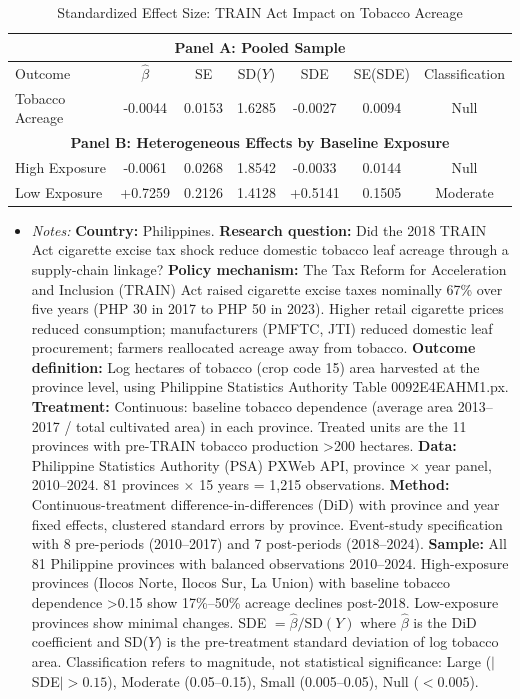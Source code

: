 \begin{table}[h]
\small
\centering
\begin{tabular}{lcccccc}
\hline\hline
\multicolumn{7}{c}{\textbf{Panel A: Pooled Sample}} \\
\hline
Outcome & $\hat{\beta}$ & SE & SD($Y$) & SDE & SE(SDE) & Classification \\
\hline
Tobacco Acreage & -0.0044 & 0.0153 & 1.6285 & -0.0027 & 0.0094 & Null \\
\hline
\multicolumn{7}{c}{\textbf{Panel B: Heterogeneous Effects by Baseline Exposure}} \\
\hline
High Exposure & -0.0061 & 0.0268 & 1.8542 & -0.0033 & 0.0144 & Null \\
Low Exposure & +0.7259 & 0.2126 & 1.4128 & +0.5141 & 0.1505 & Moderate \\
\hline
\end{tabular}
\caption{Standardized Effect Size: TRAIN Act Impact on Tobacco Acreage}
\label{tab:sde}
\begin{itemize}
\item \textit{Notes:} \textbf{Country:} Philippines. \textbf{Research question:} Did the 2018 TRAIN Act cigarette excise tax shock reduce domestic tobacco leaf acreage through a supply-chain linkage? \textbf{Policy mechanism:} The Tax Reform for Acceleration and Inclusion (TRAIN) Act raised cigarette excise taxes nominally 67\% over five years (PHP 30 in 2017 to PHP 50 in 2023). Higher retail cigarette prices reduced consumption; manufacturers (PMFTC, JTI) reduced domestic leaf procurement; farmers reallocated acreage away from tobacco. \textbf{Outcome definition:} Log hectares of tobacco (crop code 15) area harvested at the province level, using Philippine Statistics Authority Table 0092E4EAHM1.px. \textbf{Treatment:} Continuous: baseline tobacco dependence (average area 2013--2017 / total cultivated area) in each province. Treated units are the 11 provinces with pre-TRAIN tobacco production >200 hectares. \textbf{Data:} Philippine Statistics Authority (PSA) PXWeb API, province $\times$ year panel, 2010--2024. 81 provinces $\times$ 15 years = 1,215 observations. \textbf{Method:} Continuous-treatment difference-in-differences (DiD) with province and year fixed effects, clustered standard errors by province. Event-study specification with 8 pre-periods (2010--2017) and 7 post-periods (2018--2024). \textbf{Sample:} All 81 Philippine provinces with balanced observations 2010--2024. High-exposure provinces (Ilocos Norte, Ilocos Sur, La Union) with baseline tobacco dependence >0.15 show 17\%--50\% acreage declines post-2018. Low-exposure provinces show minimal changes. SDE $= \hat{\beta} / \text{SD}(Y)$ where $\hat{\beta}$ is the DiD coefficient and SD($Y$) is the pre-treatment standard deviation of log tobacco area. Classification refers to magnitude, not statistical significance: Large ($|$SDE$| > 0.15$), Moderate (0.05--0.15), Small (0.005--0.05), Null ($< 0.005$).
\end{itemize}
\end{table}
